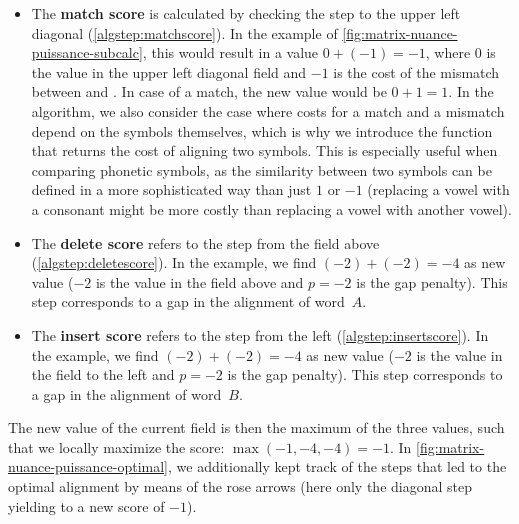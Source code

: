 \begin{itemize}

    \item The \textbf{match score} is calculated by checking the step to the upper left diagonal (\autoref{algstep:matchscore}). In the example of \autoref{fig:matrix-nuance-puissance-subcalc}, this would result in a value $0+(-1) = -1$, where $0$ is the value in the upper left diagonal field and $-1$ is the cost of the mismatch between  and . In case of a match, the new value would be $0 + 1 = 1$. In the algorithm, we also consider the case where costs for a match and a mismatch depend on the symbols themselves, which is why we introduce the function  that returns the cost of aligning two symbols. This is especially useful when comparing phonetic symbols, as the similarity between two symbols can be defined in a more sophisticated way than just $1$ or $-1$ (\eg replacing a vowel with a consonant might be more costly than replacing a vowel with another vowel).
    
    \item The \textbf{delete score} refers to the step from the field above (\autoref{algstep:deletescore}). In the example, we find $(-2) + (-2) = -4$ as new value ($-2$ is the value in the field above and $p=-2$ is the gap penalty). This step corresponds to a gap in the alignment of word~$A$.
    
    \item The \textbf{insert score} refers to the step from the left (\autoref{algstep:insertscore}). In the example, we find $(-2) + (-2) = -4$ as new value ($-2$ is the value in the field to the left and $p=-2$ is the gap penalty). This step corresponds to a gap in the alignment of word~$B$.

\end{itemize}

The new value of the current field is then the maximum of the three values, such that we locally maximize the score: $\max(-1, -4, -4) = -1$. In \autoref{fig:matrix-nuance-puissance-optimal}, we additionally kept track of the steps that led to the optimal alignment by means of the rose arrows (here only the diagonal step yielding to a new score of $-1$).
